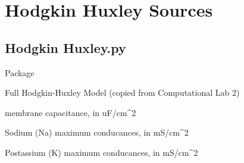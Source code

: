 \documentclass[letterpaper,10pt,english]{sphinxmanual}
\begin{document}
\chapter{Hodgkin Huxley Sources}
\label{_static/Source::doc}\label{_static/Source:hodgkin-huxley-sources}

\section{Hodgkin Huxley.py}
\label{_static/Hodgkin Huxley::doc}\label{_static/Hodgkin Huxley:hodgkin-huxley-py}
 Package
\label{_static/Hodgkin Huxley:module-Source.HodgkinHuxley}

\begin{fulllineitems}
\label{_static/Hodgkin Huxley:Source.HodgkinHuxley.HodgkinHuxley}
Full Hodgkin-Huxley Model (copied from Computational Lab 2)

\begin{fulllineitems}
\label{_static/Hodgkin Huxley:Source.HodgkinHuxley.HodgkinHuxley.C_m}
membrane capacitance, in uF/cm\textasciicircum{}2

\end{fulllineitems}


\begin{fulllineitems}
\label{_static/Hodgkin Huxley:Source.HodgkinHuxley.HodgkinHuxley.g_Na}
Sodium (Na) maximum conducances, in mS/cm\textasciicircum{}2

\end{fulllineitems}


\begin{fulllineitems}
\label{_static/Hodgkin Huxley:Source.HodgkinHuxley.HodgkinHuxley.g_K}
Postassium (K) maximum conducances, in mS/cm\textasciicircum{}2

\end{fulllineitems}



\end{fulllineitems}
\end{document}
